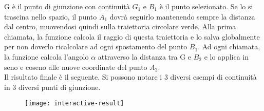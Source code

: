 G è il punto di giunzione con continuità $G_1$ e $B_1$ è il punto selezionato. Se lo si trascina nello spazio, il punto $A_1$ dovrà seguirlo mantenendo sempre la distanza dal centro, muovendosi quindi sulla traiettoria circolare verde. Alla prima chiamata, la funzione calcola il raggio di questa traiettoria e lo salva globalmente per non doverlo ricalcolare ad ogni spostamento del punto $B_1$. Ad ogni chiamata, la funzione calcola l'angolo $\alpha$ attraverso la distanza tra G e $B_2$ e lo applica in seno e coseno alle nuove coordinate del punto $A_2$.\\


Il risultato finale è il seguente. Si possono notare i 3 diversi esempi di continuità in 3 diversi punti di giunzione.
 \begin{figure}[htb]
    \centering
    \texttt{[image: interactive-result]}
    \caption{\label{fig:interactive-result}}
    \vspace{-0.3cm}
\end{figure}




































%